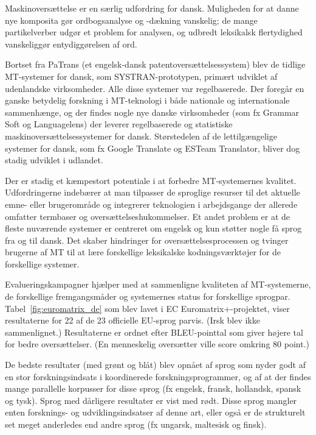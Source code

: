 \begin{multicols}{2}
Maskinovers\ae ttelse er en s\ae rlig udfordring for dansk. Muligheden for at danne nye komposita g\o r ordbogsanalyse og -d\ae kning vanskelig; de mange partikelverber udg\o r et problem for analysen, og udbredt leksikalsk flertydighed vanskeligg\o r  entydigg\o relsen af ord. 

Bortset fra PaTrans (et engelsk-dansk patentovers\ae ttelsessystem) blev de tidlige MT-systemer for dansk, som SYSTRAN-prototypen, prim\ae rt udviklet af udenlandske virksomheder. Alle disse systemer var regelbaserede. Der foreg\aa r en ganske betydelig forskning i MT-teknologi i b\aa de nationale og internationale sammenh\ae nge, og der findes nogle nye danske virksomheder (som fx Grammar Soft  og Languagelens) der leverer regelbaserede og statistiske maskinovers\ae ttelsessystemer for dansk. St\o rstedelen af de lettilg\ae ngelige systemer for dansk, som fx Google Translate og ESTeam Translator, bliver dog stadig udviklet i udlandet.


Der er stadig et k\ae mpestort potentiale i at forbedre MT-systemernes kvalitet. Udfordringerne indeb\ae rer at man tilpasser de sproglige resurser til det aktuelle emne- eller brugeromr\aa de og integrerer teknologien i arbejdsgange der allerede omfatter termbaser og overs\ae ttelseshukommelser. Et andet problem er at de fleste nuv\ae rende systemer er centreret om engelsk og kun st\o tter nogle \mbox{f\aa} sprog fra og til dansk. Det skaber hindringer for overs\ae ttelsesprocessen og tvinger brugerne af MT til at l\ae re forskellige leksikalske kodningsv\ae rkt\o jer for de forskellige systemer. 

Evalueringskampagner hj\ae lper med at sammenligne kvaliteten af MT-systemerne, de forskellige fremgangsm\aa der og systemernes status for forskellige sprogpar. Tabel~\ref{fig:euromatrix_de} som blev lavet i EC Euromatrix+-projektet, viser resultaterne for 22 af de 23 officielle EU-sprog parvis. (Irsk blev ikke sammenlignet.) Resultaterne er ordnet efter BLEU-pointtal \cite{bleu1} som giver h\o jere tal for bedre overs\ae ttelser.   (En menneskelig overs\ae tter ville score omkring 80 point.)

De bedste resultater (med gr\o nt og bl\aa t) blev opn\aa et af sprog som nyder godt af en stor forskningsindsats i koordinerede forskningsprogrammer, og af at der findes mange parallelle korpusser for disse sprog (fx engelsk, fransk, hollandsk, spansk og tysk). Sprog med d\aa rligere resultater er vist med r\o dt. Disse sprog mangler enten forsknings- og udviklingsindsatser af denne art, eller \mbox{ogs\aa} er de strukturelt set meget anderledes end andre sprog (fx ungarsk, maltesisk og finsk).



\end{multicols}
